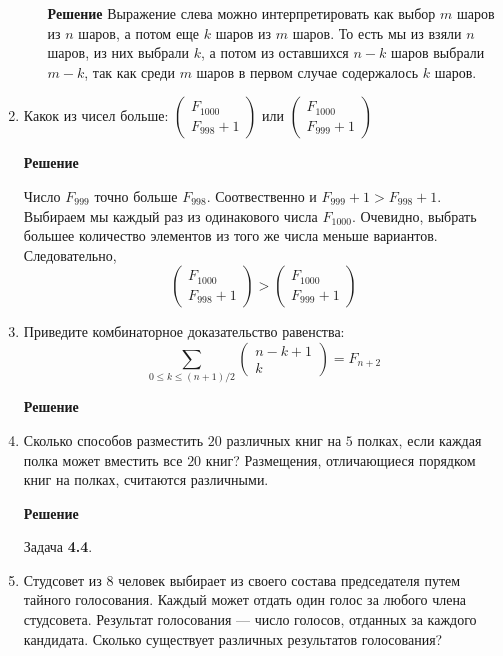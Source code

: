 \documentclass[12pt]{article}
\begin{document}
\begin{enumerate}[label={\textbf{\arabic{section}.\arabic*}}]
\begin{enumerate}[label=\textbf{\alph*)}]
			\textbf{Решение}
			Выражение слева можно интерпретировать как выбор $m$ шаров из $n$ шаров, а потом еще $k$ шаров из $m$ шаров. То есть мы из взяли $n$ шаров, из них выбрали $k$, а потом из оставшихся $n-k$ шаров выбрали $m-k$, так как среди $m$ шаров в первом случае содержалось $k$ шаров.
		\end{enumerate}
	
		\item Какок из чисел больше: 
		$
		\begin{pmatrix}
			F_{1000} \\
			F_{998} + 1
		\end{pmatrix}
		$
		или
		$
		\begin{pmatrix}
			F_{1000} \\
			F_{999} + 1
		\end{pmatrix}
		$
		
		\textbf{Решение}
		
		Число $F_{999}$ точно больше $F_{998}$. Соотвественно и $F_{999} + 1 > F_{998} + 1$. Выбираем мы каждый раз из одинакового числа $F_{1000}$. Очевидно, выбрать большее количество элементов из того же числа меньше вариантов. Следовательно,
		$$
		\begin{pmatrix}
			F_{1000} \\
			F_{998} + 1
		\end{pmatrix}
		>
		\begin{pmatrix}
			F_{1000} \\
			F_{999} + 1
		\end{pmatrix}
		$$
		\item Приведите комбинаторное доказательство равенства:
		$$
		\sum_{0\leq k \leq(n+1)/2}^{}
		\begin{pmatrix}
			n - k + 1 \\
			k
		\end{pmatrix} =
		F_{n+2}
		$$
		
		\textbf{Решение}
		
		\item Сколько способов разместить $20$ различных книг на $5$ полках, если каждая полка может	вместить все $20$ книг? Размещения, отличающиеся порядком книг на полках, считаются различными.
		
		\textbf{Решение}
		
		Задача \textbf{4.4}.
		
		\item Студсовет из $8$ человек выбирает из своего состава председателя путем тайного голосования. Каждый может отдать один голос за любого члена студсовета. Результат голосования --- число голосов, отданных за каждого кандидата. Сколько существует различных результатов голосования?
		

\end{enumerate}
\end{document}
